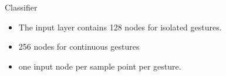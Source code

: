 \documentclass{beamer}
\begin{document}

\begin{frame}{Classifier}
\begin{itemize}
\item The input layer contains 128 nodes for isolated gestures.
\linebreak
\item 256 nodes for continuous gestures
\linebreak
\item one input node per sample
point per gesture.



\end{itemize}
\end{frame}


%


\end{document}
